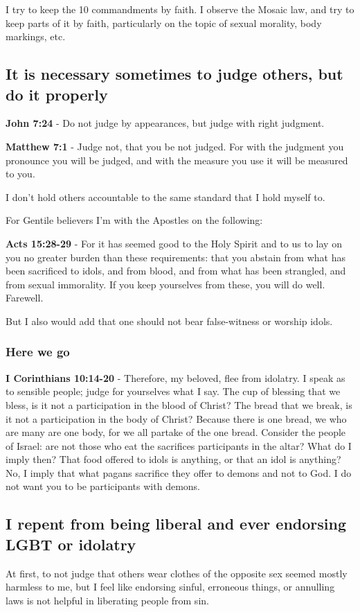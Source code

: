 \documentclass[11pt]{article}
\begin{document}
I try to keep the 10 commandments by faith.
I observe the Mosaic law, and try to keep parts of it by faith, particularly
on the topic of sexual morality, body markings, etc.

\subsection{It is necessary sometimes to judge others, but do it properly}
\label{sec:org15a730a}
\textbf{John 7:24} - Do not judge by appearances, but judge with right judgment.

\textbf{Matthew 7:1} - Judge not, that you be not judged.  For with the judgment you pronounce you will be judged, and with the measure you use it will be measured to you.

I don't hold others accountable to the same standard that I hold myself to.

For Gentile believers I'm with the Apostles on the following:

\textbf{Acts 15:28-29} - For it has seemed good to the Holy Spirit and to us to lay on you no greater burden than these requirements: that you abstain from what has been sacrificed to idols, and from blood, and from what has been strangled, and from sexual immorality. If you keep yourselves from these, you will do well. Farewell.

But I also would add that one should not bear false-witness or worship idols.

\subsubsection{Here we go}
\label{sec:orgc03fb85}
\textbf{I Corinthians 10:14-20} - Therefore, my beloved, flee from idolatry.  I speak as to sensible people; judge for yourselves what I say.  The cup of blessing that we bless, is it not a participation in the blood of Christ? The bread that we break, is it not a participation in the body of Christ?  Because there is one bread, we who are many are one body, for we all partake of the one bread.  Consider the people of Israel: are not those who eat the sacrifices participants in the altar?  What do I imply then? That food offered to idols is anything, or that an idol is anything?  No, I imply that what pagans sacrifice they offer to demons and not to God. I do not want you to be participants with demons.

\subsection{I repent from being liberal and ever endorsing LGBT or idolatry}
\label{sec:orgb58abd9}
At first, to not judge that others wear
clothes of the opposite sex seemed mostly
harmless to me, but I feel like endorsing
sinful, erroneous things, or annulling laws
is not helpful in liberating people from sin.
\end{document}

